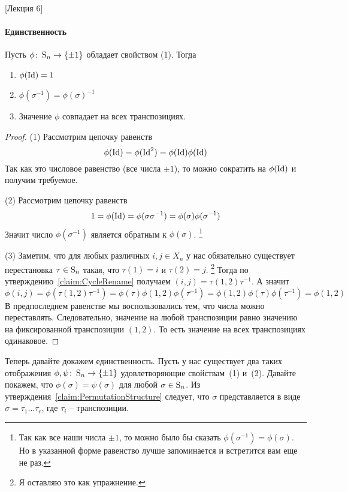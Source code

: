 [Лекция 6]


\paragraph{Единственность}

\begin{claim*}
Пусть $\phi\colon \operatorname{S}_{n}\to \{\pm1\}$ обладает свойством (1).
Тогда
\begin{enumerate}
\item $\phi(\operatorname{Id}) = 1$

\item $\phi(\sigma^{-1}) = \phi(\sigma)^{-1}$

\item Значение $\phi$ совпадает на всех транспозициях.
\end{enumerate}
\end{claim*}
\begin{proof}
(1) Рассмотрим цепочку равенств
\[
\phi(\operatorname{Id}) = \phi(\operatorname{Id}^2) = \phi(\operatorname{Id})\phi(\operatorname{Id})
\]
Так как это числовое равенство (все числа $\pm 1$), то можно сократить на $\phi(\operatorname{Id})$ и получим требуемое.


(2) Рассмотрим цепочку равенств
\[
1 = \phi(\operatorname{Id}) = \phi(\sigma \sigma^{-1}) = \phi(\sigma)\phi(\sigma^{-1})
\]
Значит число $\phi(\sigma^{-1})$ является обратным к $\phi(\sigma)$.%
\footnote{Так как все наши числа $\pm 1$, то можно было бы сказать $\phi(\sigma^{-1}) = \phi(\sigma)$.
Но в указанной форме равенство лучше запоминается и встретится вам еще не раз.}

(3) Заметим, что для любых различных $i, j\in X_n$ у нас обязательно существует перестановка $\tau\in\operatorname{S}_{n}$ такая, что $\tau(1) = i$ и $\tau(2) = j$.%
\footnote{Я оставляю это как упражнение.}
Тогда по утверждению~\ref{claim:CycleRename} получаем $(i,j) = \tau (1,2)\tau^{-1}$.
А значит
\[
\phi(i,j) = \phi(\tau (1,2) \tau^{-1}) = \phi(\tau)\phi(1,2)\phi(\tau^{-1}) = \phi(1,2)\phi(\tau)\phi(\tau^{-1}) = \phi(1,2)
\]
В предпоследнем равенстве мы воспользовались тем, что числа можно переставлять.
Следовательно, значение на любой транспозиции равно значению на фиксированной транспозиции $(1,2)$.
То есть значение на всех транспозициях одинаковое.
\end{proof}

Теперь давайте докажем единственность.
Пусть у нас существует два таких отображения $\phi, \psi\colon \operatorname{S}_{n}\to \{\pm 1\}$ удовлетворяющие свойствам~(1) и~(2).
Давайте покажем, что $\phi(\sigma) = \psi(\sigma)$ для любой $\sigma\in\operatorname{S}_{n}$.
Из утверждения~\ref{claim:PermutationStructure}  следует, что $\sigma$ представляется в виде $\sigma = \tau_1\ldots\tau_r$, где $\tau_i$ -- транспозиции.

